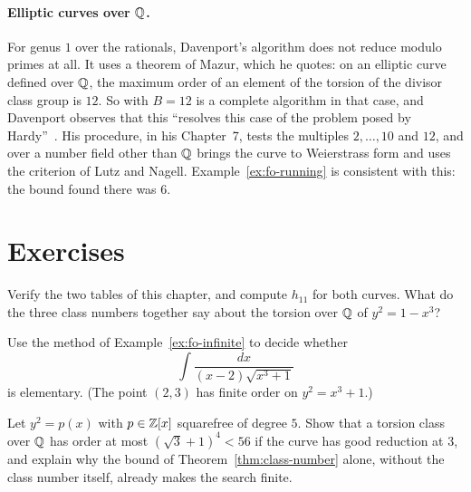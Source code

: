 \paragraph{Elliptic curves over $\mathbb{Q}$.} For genus $1$ over the rationals,
Davenport's algorithm does not reduce modulo primes at all. It uses a theorem
of Mazur, which he quotes: on an elliptic curve defined over $\mathbb{Q}$, the
maximum order of an element of the torsion of the divisor class group is
$12$. So  with $B = 12$ is a complete algorithm in
that case, and Davenport observes that this ``resolves this case of the
problem posed by Hardy''~\cite[Chapter~5]{davenport1981}. His procedure, in
his Chapter~7, tests the multiples $2, \dots, 10$ and $12$, and over a number
field other than $\mathbb{Q}$ brings the curve to Weierstrass form and uses the
criterion of Lutz and Nagell. Example~\ref{ex:fo-running} is consistent with this: the bound found
there was $6$.

\section*{Exercises}

\begin{exercise}
Verify the two tables of this chapter, and compute $h_{11}$ for both curves.
What do the three class numbers together say about the torsion over $\mathbb{Q}$ of
$y^2 = 1 - x^3$?
\end{exercise}

\begin{exercise}
Use the method of Example~\ref{ex:fo-infinite} to decide whether
\[
  \int \frac{dx}{(x - 2) \sqrt{x^3 + 1}}
\]
is elementary. (The point $(2, 3)$ has finite order on $y^2 = x^3 + 1$.)
\end{exercise}

\begin{exercise}
Let $y^2 = p(x)$ with $p \in \mathbb{Z}[x]$ squarefree of degree $5$. Show that a
torsion class over $\mathbb{Q}$ has order at most $(\sqrt 3 + 1)^4 < 56$ if the curve
has good reduction at $3$, and explain why the bound of
Theorem~\ref{thm:class-number} alone, without the class number itself,
already makes the search finite.
\end{exercise}
